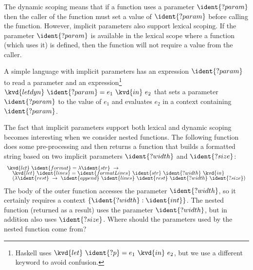 The dynamic scoping means that if a function uses a parameter $\ident{?param}$ then the caller of the 
function must set a value of $\ident{?param}$ before calling the function. However, implicit 
parameters also support lexical scoping. If the parameter $\ident{?param}$ is available in the 
lexical scope where a function (which uses it) is defined, then the function will not require a
value from the caller.

A simple language with implicit parameters has an expression $\ident{?param}$ to read a parameter 
and an expression\footnote{Haskell uses $\kvd{let}~\ident{?p} = e_1~\kvd{in}~e_2$, but we use a 
different keyword to avoid confusion.} $\kvd{letdyn}~\ident{?param} = e_1~\kvd{in}~e_2$ that sets a 
parameter $\ident{?param}$ to the value of $e_1$ and evaluates $e_2$ in a context containing 
$\ident{?param}$. 

The fact that implicit parameters support both lexical and dynamic scoping becomes interesting
when we consider nested functions. The following function does some pre-processing and then returns a 
function that builds a formatted string based on two implicit parameters $\ident{?width}$ and 
$\ident{?size}$:
%
\begin{equation*}
\begin{array}{l}
\kvd{let}~\ident{format} = \lambda \ident{str}~\rightarrow \\[-0.25em]
\quad \kvd{let}~\ident{lines} = \ident{formatLines}~\ident{str}~\ident{?width}~\kvd{in}\\[-0.25em]
\quad (\lambda \ident{rest}~\rightarrow~\ident{append}~
         \ident{lines}~\ident{rest}~\ident{?width}~\ident{?size})
\end{array}
\end{equation*}
%
The body of the outer function accesses the parameter $\ident{?width}$, so it certainly requires a context 
$\{ \ident{?width} : \ident{int} \}$. The nested function (returned as a result) uses the parameter 
$\ident{?width}$, but in addition also uses $\ident{?size}$. Where should the parameters used by the 
nested function come from?

